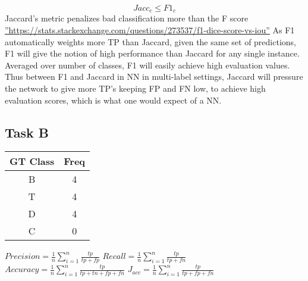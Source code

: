 \documentclass[10pt]{article}
\begin{document}
$$Jacc_c\leq{F1_c}$$
Jaccard's metric penalizes bad classification more than the F score \hyperref[besteval]{''https://stats.stackexchange.com/questions/273537/f1-dice-score-vs-iou''}
As F1 automatically weights more TP than Jaccard, given the same set of predictions,
F1 will give the notion of high performance than Jaccard for any single instance.
Averaged over number of classes, F1 will easily achieve high evaluation values.
Thus between F1 and Jaccard in NN in multi-label settings, Jaccard will pressure
the network to give more TP's keeping FP and FN low, to achieve high evaluation scores, which is what
one would expect of a NN.
\subsection{Task B}
\begin{center}
\begin{tabular}{ c c  }
 GT Class &  Freq  \\
 \hline
  B & 4  \\
 T & 4   \\
  D & 4  \\
 C & 0
\end{tabular}
\end{center}
$Precision =\frac{1}{n}\sum_{i=1}^{n} \frac{tp}{tp+fp}$
$Recall =\frac{1}{n}\sum_{i=1}^{n} \frac{tp}{tp+fn}$
$Accuracy =\frac{1}{n}\sum_{i=1}^{n} \frac{tp}{tp+tn+fp+fn}$
$J_{acc} =\frac{1}{n}\sum_{i=1}^{n} \frac{tp}{tp+fp+fn}$
\end{document}
